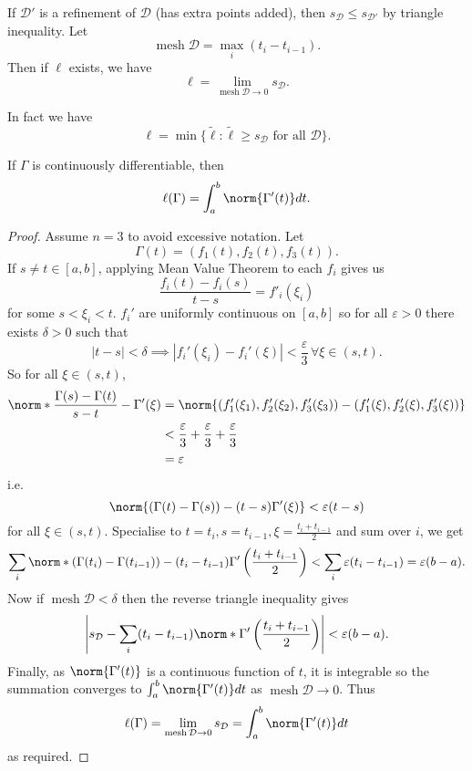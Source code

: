 \documentclass[a4paper]{article}
\DeclareMathOperator{\mesh}{mesh}
\begin{document}
If \(\mathcal D'\) is a refinement of \(\mathcal D\) (has extra points added), then \(s_{\mathcal D} \leq s_{\mathcal D'}\) by triangle inequality. Let
\[
  \mesh \mathcal D = \max_i(t_i - t_{i - 1}).
\]
Then if \(\ell\) exists, we have
\[
  \ell = \lim_{\mesh \mathcal D \to 0} s_{\mathcal D}.
\]

\begin{note}
  In fact we have
  \[
    \ell = \min\{\tilde \ell: \tilde \ell \geq s_{\mathcal D} \text{ for all } \mathcal D\}.
  \]
\end{note}

\begin{proposition}
  If \(\Gamma\)  is continuously differentiable, then
  \[
    \ell(\Gamma) = \int_a^b \norm{\Gamma'(t)} dt.
  \]
\end{proposition}

\begin{proof}
  Assume \(n = 3\) to avoid excessive notation. Let
  \[
    \Gamma(t) = (f_1(t), f_2(t), f_3(t)).
  \]
  If \(s \neq t \in [a, b]\), applying Mean Value Theorem to each \(f_i\) gives us
  \[
    \frac{f_i(t) - f_i(s)}{t - s} = f'_i(\xi_i)
  \]
  for some \(s < \xi_i < t\). \(f_i'\) are uniformly continuous on \([a, b]\) so for all \(\varepsilon > 0\) there exists \(\delta > 0\) such that
  \[
    |t - s| < \delta \implies |f_i'(\xi_i) - f_i'(\xi)| < \frac{\varepsilon}{3} \, \forall \xi \in (s, t).
  \]
  So for all \(\xi \in (s, t)\),
  \begin{align*}
    \norm*{\frac{\Gamma(s) - \Gamma(t)}{s - t} - \Gamma'(\xi)} &= \norm{(f_1'(\xi_1), f_2'(\xi_2), f_3'(\xi_3)) - (f_1'(\xi), f_2'(\xi), f_3'(\xi))} \\
                                                               &< \frac{\varepsilon}{3} + \frac{\varepsilon}{3} +\frac{\varepsilon}{3} \\
                                                               &= \varepsilon
  \end{align*}
  i.e.
  \[
    \norm{(\Gamma(t) - \Gamma(s)) - (t - s)\Gamma'(\xi)} < \varepsilon(t - s)
  \]
  for all \(\xi \in (s, t)\). Specialise to \(t = t_i, s= t_{i - 1}, \xi = \frac{t_i + t_{i - 1}}{2}\) and sum over \(i\), we get
  \[
    \sum_i \norm*{(\Gamma(t_i) - \Gamma(t_{i - 1})) - (t_i - t_{i - 1}) \Gamma'\left(\frac{t_i + t_{i - 1}}{2}\right)} < \sum_i \varepsilon(t_i - t_{i - 1}) = \varepsilon(b - a).
  \]
  Now if \(\mesh \mathcal D < \delta\) then the reverse triangle inequality gives
  \[
    \left|s_{\mathcal D}  - \sum_i (t_i - t_{i - 1}) \norm*{\Gamma'\left(\frac{t_i + t_{i - 1}}{2}\right)}\right| < \varepsilon (b - a).
  \]
  Finally, as \(\norm{\Gamma'(t)}\) is a continuous function of \(t\), it is integrable so the summation converges to \(\int_a^b \norm{\Gamma'(t)} dt\) as \(\mesh \mathcal D \to 0\). Thus
  \[
    \ell(\Gamma) = \lim_{\mesh \mathcal D \to 0} s_{\mathcal D} = \int_a^b \norm{\Gamma'(t)} dt
  \]
  as required.
\end{proof}
\end{document}
